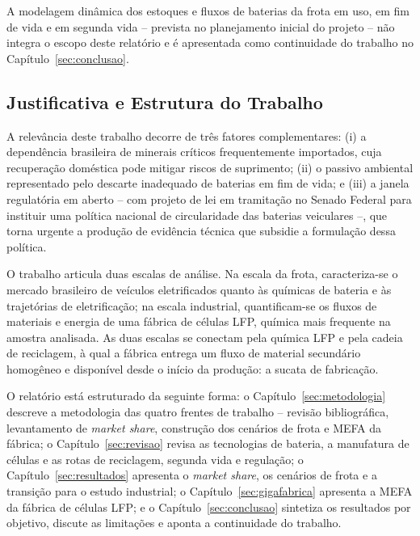 A modelagem dinâmica dos estoques e fluxos de baterias da frota em uso, em fim
de vida e em segunda vida -- prevista no planejamento inicial do projeto -- não
integra o escopo deste relatório e é apresentada como continuidade do trabalho
no Capítulo~\ref{sec:conclusao}.

\subsection{Justificativa e Estrutura do Trabalho}
\label{subsec:justificativa}

A relevância deste trabalho decorre de três fatores complementares: (i) a
dependência brasileira de minerais críticos frequentemente importados, cuja
recuperação doméstica pode mitigar riscos de suprimento; (ii) o passivo
ambiental representado pelo descarte inadequado de baterias em fim de vida; e
(iii) a janela regulatória em aberto -- com projeto de lei em tramitação no
Senado Federal para instituir uma política nacional de circularidade das
baterias veiculares \cite{dialogueearth2026} --, que torna urgente a produção de
evidência técnica que subsidie a formulação dessa política.

O trabalho articula duas escalas de análise. Na escala da frota, caracteriza-se
o mercado brasileiro de veículos eletrificados quanto às químicas de bateria e
às trajetórias de eletrificação; na escala industrial, quantificam-se os fluxos
de materiais e energia de uma fábrica de células LFP, química mais frequente na
amostra analisada. As duas escalas se conectam pela química LFP e pela cadeia de
reciclagem, à qual a fábrica entrega um fluxo de material secundário homogêneo e
disponível desde o início da produção: a sucata de fabricação.

O relatório está estruturado da seguinte forma: o
Capítulo~\ref{sec:metodologia} descreve a metodologia das quatro frentes de
trabalho -- revisão bibliográfica, levantamento de \textit{market share},
construção dos cenários de frota e MEFA da fábrica; o
Capítulo~\ref{sec:revisao} revisa as tecnologias de bateria, a manufatura de
células e as rotas de reciclagem, segunda vida e regulação; o
Capítulo~\ref{sec:resultados} apresenta o \textit{market share}, os cenários de
frota e a transição para o estudo industrial; o Capítulo~\ref{sec:gigafabrica}
apresenta a MEFA da fábrica de células LFP; e o Capítulo~\ref{sec:conclusao}
sintetiza os resultados por objetivo, discute as limitações e aponta a
continuidade do trabalho.
